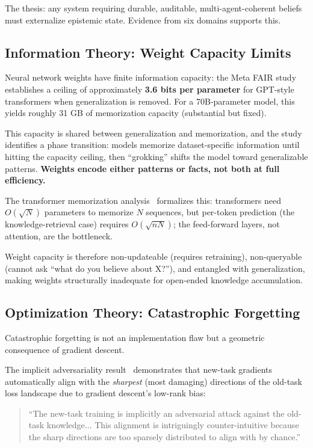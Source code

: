 \documentclass[11pt,letterpaper]{article}
\begin{document}
The thesis: any system requiring durable, auditable, multi-agent-coherent beliefs must externalize epistemic state. Evidence from six domains supports this.

\subsection{Information Theory: Weight Capacity Limits}

Neural network weights have finite information capacity: the Meta FAIR study~\cite{metafair2026} establishes a ceiling of approximately \textbf{3.6 bits per parameter} for GPT-style transformers when generalization is removed. For a 70B-parameter model, this yields roughly 31 GB of memorization capacity (substantial but fixed).

This capacity is shared between generalization and memorization, and the study identifies a phase transition: models memorize dataset-specific information until hitting the capacity ceiling, then ``grokking'' shifts the model toward generalizable patterns. \textbf{Weights encode either patterns or facts, not both at full efficiency.}

The transformer memorization analysis~\cite{transformermem2025} formalizes this: transformers need $O(\sqrt{N})$ parameters to memorize $N$ sequences, but per-token prediction (the knowledge-retrieval case) requires $O(\sqrt{nN})$; the feed-forward layers, not attention, are the bottleneck.

Weight capacity is therefore non-updateable (requires retraining), non-queryable (cannot ask ``what do you believe about X?''), and entangled with generalization, making weights structurally inadequate for open-ended knowledge accumulation.

\subsection{Optimization Theory: Catastrophic Forgetting}

Catastrophic forgetting is not an implementation flaw but a geometric consequence of gradient descent.

The implicit adversariality result~\cite{adversarial2025} demonstrates that new-task gradients automatically align with the \textit{sharpest} (most damaging) directions of the old-task loss landscape due to gradient descent's low-rank bias:

\begin{quote}
``The new-task training is implicitly an adversarial attack against the old-task knowledge... This alignment is intriguingly counter-intuitive because the sharp directions are too sparsely distributed to align with by chance.''
\end{quote}
\end{document}
